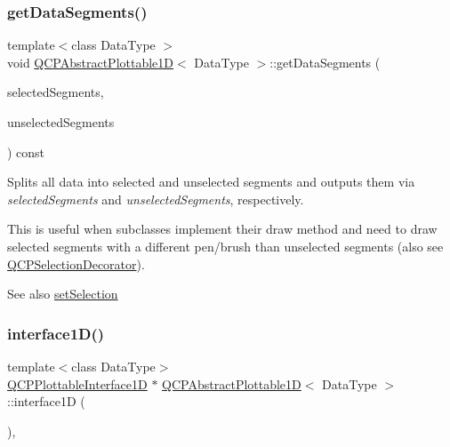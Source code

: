 \subsubsection{\texorpdfstring{get\+Data\+Segments()}{getDataSegments()}}
{\footnotesize\ttfamily template$<$class Data\+Type $>$ \\
void \hyperlink{classQCPAbstractPlottable1D}{Q\+C\+P\+Abstract\+Plottable1D}$<$ Data\+Type $>$\+::get\+Data\+Segments (\begin{DoxyParamCaption}\item[{Q\+List$<$ \hyperlink{classQCPDataRange}{Q\+C\+P\+Data\+Range} $>$ \&}]{selected\+Segments,  }\item[{Q\+List$<$ \hyperlink{classQCPDataRange}{Q\+C\+P\+Data\+Range} $>$ \&}]{unselected\+Segments }\end{DoxyParamCaption}) const\hspace{0.3cm}{\ttfamily [protected]}}

Splits all data into selected and unselected segments and outputs them via {\itshape selected\+Segments} and {\itshape unselected\+Segments}, respectively.

This is useful when subclasses implement their draw method and need to draw selected segments with a different pen/brush than unselected segments (also see \hyperlink{classQCPSelectionDecorator}{Q\+C\+P\+Selection\+Decorator}).

\begin{DoxySeeAlso}{See also}
\hyperlink{classQCPAbstractPlottable_a219bc5403a9d85d3129165ec3f5ae436}{set\+Selection} 
\end{DoxySeeAlso}
\mbox{\label{classQCPAbstractPlottable1D_ac58fb47bfe330f6931ed8e64326387d7}} 
\subsubsection{\texorpdfstring{interface1\+D()}{interface1D()}}
{\footnotesize\ttfamily template$<$class Data\+Type$>$ \\
\hyperlink{classQCPPlottableInterface1D}{Q\+C\+P\+Plottable\+Interface1D} $\ast$ \hyperlink{classQCPAbstractPlottable1D}{Q\+C\+P\+Abstract\+Plottable1D}$<$ Data\+Type $>$\+::interface1D (\begin{DoxyParamCaption}{ }\end{DoxyParamCaption})\hspace{0.3cm}{\ttfamily [inline]}, {\ttfamily [virtual]}}

